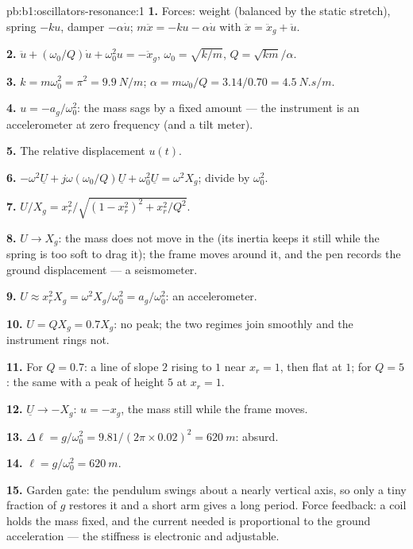 \begin{solution}{pb:b1:oscillators-resonance:1}
\textbf{1.} Forces: weight (balanced by the static stretch), spring
$-ku$, damper $-\alpha\dot u$; $m\ddot x = -ku - \alpha\dot u$ with $\ddot x =
\ddot x_g + \ddot u$.

\textbf{2.} $\ddot u + (\omega_0/Q)\dot u + \omega_0^2u = -\ddot x_g$, $\omega_0 =
\sqrt{k/m}$, $Q = \sqrt{km}/\alpha$.

\textbf{3.} $k = m\omega_0^2 = \pi^2 = \qty{9.9}{N/m}$; $\alpha = m\omega_0/Q =
3.14/0.70 = \qty{4.5}{N.s/m}$.

\textbf{4.} $u = -a_g/\omega_0^2$: the mass sags by a fixed amount --- the
instrument is an accelerometer at zero frequency (and a tilt meter).

\textbf{5.} The relative displacement $u(t)$.

\textbf{6.} $-\omega^2\underline U + j\omega(\omega_0/Q)\underline U + \omega_0^2\underline U
= \omega^2X_g$; divide by $\omega_0^2$.

\textbf{7.} $U/X_g = x_r^2/\sqrt{(1 - x_r^2)^2 + x_r^2/Q^2}$.

\textbf{8.} $U \to X_g$: the mass does not move in the 
(its inertia keeps it still while the spring is too soft to drag it);
the frame moves around it, and the pen records the ground displacement
--- a seismometer.

\textbf{9.} $U \approx x_r^2X_g = \omega^2X_g/\omega_0^2 = a_g/\omega_0^2$: an
accelerometer.

\textbf{10.} $U = QX_g = 0.7X_g$: no peak; the two regimes join smoothly
and the instrument rings not.

\textbf{11.} For $Q = 0.7$: a line of slope $2$ rising to $1$ near
$x_r = 1$, then flat at $1$; for $Q = 5$: the same with a peak of height
$5$ at $x_r = 1$.

\textbf{12.} $\underline U \to -X_g$: $u = -x_g$, the mass still while the
frame moves.

\textbf{13.} $\Delta\ell = g/\omega_0^2 = 9.81/(2\pi \times 0.02)^2 = \qty{620}{m}$:
absurd.

\textbf{14.} $\ell = g/\omega_0^2 = \qty{620}{m}$.

\textbf{15.} Garden gate: the pendulum swings about a nearly vertical
axis, so only a tiny fraction of $g$ restores it and a short arm gives
a long period. Force feedback: a coil holds the mass fixed, and the
current needed is proportional to the ground acceleration --- the
stiffness is electronic and adjustable.


\end{solution}
